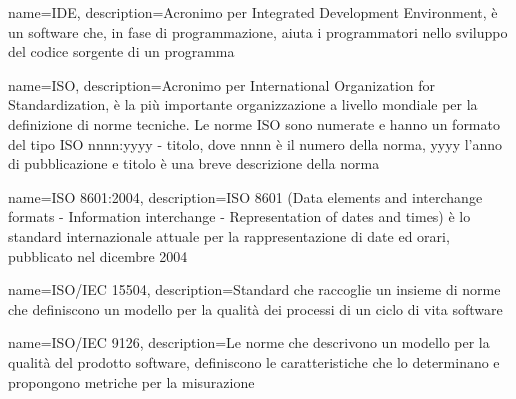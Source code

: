 {
	name=IDE,
	description={Acronimo per Integrated Development Environment, è un software che, in fase di programmazione, aiuta i programmatori nello sviluppo del codice sorgente di un programma}
}

{
	name=ISO,
	description={Acronimo per International Organization for Standardization, è la più importante organizzazione a livello mondiale per la definizione di norme tecniche. Le norme ISO sono numerate e hanno un formato del tipo ISO nnnn:yyyy - titolo, dove nnnn è il numero della norma, yyyy l'anno di pubblicazione e titolo è una breve descrizione della norma}
}

{
	name=ISO 8601:2004,
	description={ISO 8601 (Data elements and interchange formats - Information interchange - Representation of dates and times) è lo standard internazionale attuale per la rappresentazione di date ed orari, pubblicato nel dicembre 2004}
}

{
	name=ISO/IEC 15504,
	description={Standard che raccoglie un insieme di norme che definiscono un modello per la qualità dei processi di un ciclo di vita software}
}

{
	name=ISO/IEC 9126,
	description={Le norme che descrivono un modello per la qualità del prodotto software, definiscono le caratteristiche che lo determinano e propongono metriche per la misurazione}
}